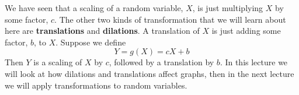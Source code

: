 




\noindent We have seen that a scaling of a random variable, $X$, is just multiplying $X$ by some factor, $c$. The other two kinds of transformation that we will learn about here are \textbf{translations} and \textbf{dilations}. A translation of $X$ is just adding some factor, $b$, to $X$. Suppose we define
\[
Y = g(X) = cX + b
\]
Then $Y$ is a scaling of $X$ by $c$, followed by a translation by $b$. In this lecture we will look at how dilations and translations affect graphs, then in the next lecture we will apply transformations to random variables.


%
%
%
%

